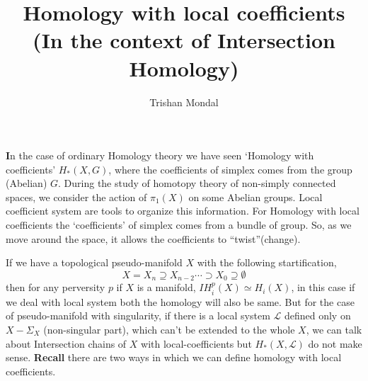 \documentclass[11pt]{article}
\title{\textbf{Homology with local coefficients} \\[0.25cm]
\small{(In the context of Intersection Homology)}}
\author{Trishan Mondal}
\date{}
\begin{document}
\maketitle

\noindent \textbf{I}n the case of ordinary Homology theory we have seen `Homology with coefficients' $H_{\ast}(X,G)$, where the coefficients of simplex comes from the group (Abelian) $G$. During the study of homotopy theory of non-simply connected spaces, we consider the action of $\pi_1(X)$ on some Abelian groups. Local coefficient system are tools to organize this information. For Homology with local coefficients the `coefficients' of simplex comes from a bundle of group. So, as we move around the space, it allows the coefficients to ``twist''(change). 

\vspace*{0.2cm}

If we have a topological pseudo-manifold $X$ with the following startification, $$X=X_n \supseteq X_{n-2}\cdots \supset X_0 \supseteq \emptyset$$ then for any perversity $p$ if $X$ is a manifold, $IH^{p}_{i}(X) \simeq H_{i}(X)$, in this case if we deal with local system both the homology will also be same. But for the case of pseudo-manifold with singularity, if there is a local system $\mathcal{L}$ defined only on $X - \Sigma_{X}$ (non-singular part), which can't be extended to the whole $X$, we can talk about Intersection chains of $X$ with local-coefficients but $H_{\ast}(X,\mathcal{L})$ do not make sense. \textbf{Recall} there are two ways in which we can define homology with local coefficients. 

\vspace*{0.2cm}
\end{document}
